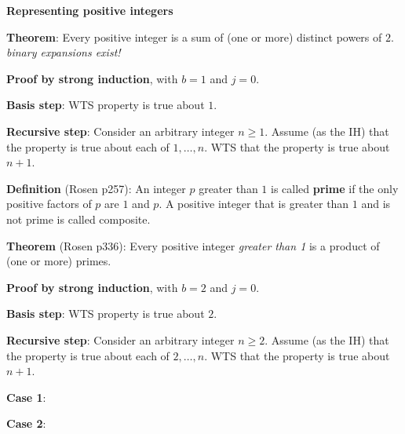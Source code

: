 \documentclass[12pt, oneside]{article}
\begin{document}
\vfill

\newpage
{\bf  Representing positive integers}


{\bf Theorem}: Every positive integer is a sum of (one or more) distinct powers of $2$. {\it  
binary expansions exist!}



{\bf Proof by strong induction}, with $b=1$ and $j=0$.


{\bf Basis step}:  WTS property is true about  $1$.


{\bf Recursive step}: Consider an arbitrary integer $n \geq 1$.
Assume (as the IH) that the property is true about  each of $1, \ldots, n$.  
WTS that the property is true about  $n+1$.


\vfill

{\bf Definition} (Rosen p257):  An integer $p$ greater than $1$ is called {\bf prime} if the only positive factors of 
$p$ are $1$ and $p$. A positive integer that is greater than $1$ and is not prime is called composite. 



{\bf Theorem} (Rosen p336): Every positive integer {\it greater than 1} is a product of (one or more) primes.

{\bf Proof by strong induction}, with $b=2$ and $j=0$.

{\bf Basis step}:  WTS property is true about  $2$.
\vspace{20pt}

{\bf Recursive step}: Consider an arbitrary integer $n \geq 2$.
Assume (as the IH) that the property is true about  each of $2, \ldots, n$.  
WTS that the property is true about  $n+1$.


{\bf Case 1}: 


{\bf Case 2}: 

\vfill
\end{document}
